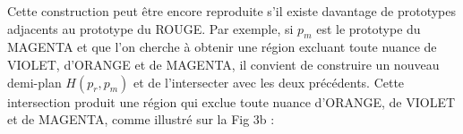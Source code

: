\documentclass{article}
\begin{document}
Cette construction peut être encore reproduite s’il existe davantage de prototypes adjacents au prototype du ROUGE. Par exemple, si $p_m$ est le prototype du MAGENTA et que l'on cherche à obtenir une région excluant toute nuance de VIOLET, d'ORANGE et de MAGENTA, il convient de construire un nouveau demi-plan $H(p_r, p_m)$ et de l'intersecter avec les deux précédents. Cette intersection produit une région qui exclue toute nuance d'ORANGE, de VIOLET et de MAGENTA, comme illustré sur la Fig 3b :


\begin{figure}[h!]
\centering %

\begin{minipage}{0.48\textwidth}
\centering
{}
\end{minipage}
\end{figure}
\end{document}
